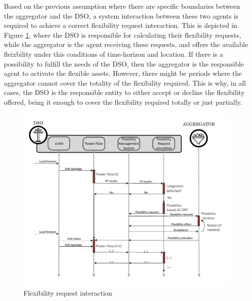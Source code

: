 Based on the previous assumption where there are specific boundaries between the aggregator and the DSO, a system interaction between these two agents is required to achieve a correct flexibility request interaction. This is depicted in Figure \ref{fig:AGG_DSO_FR}, where the DSO is responsible for calculating their flexibility requests, while the aggregator is the agent receiving these requests, and offers the available fleixbility under this conditions of time-horizon and location. If there is a possibility to fulfill the needs of the DSO, then the aggregator is the responsible agent to activate the flexible assets. However, there might be periods where the aggregator cannot cover the totality of the flexibility required. This is why, in all cases, the DSO is the responsible entity to either accept or decline the flexibility offered, being it enough to cover the flexibility required totally or just partially.  

\begin{figure}[h]
	\centering
	\includegraphics[width=1\columnwidth ]{ChapterOPF_DSO/Figures/OPF_interaction_ACOPF.pdf}
		\caption{Flexibility request interaction}
	\label{fig:AGG_DSO_FR}  
\end{figure}

\newpage
